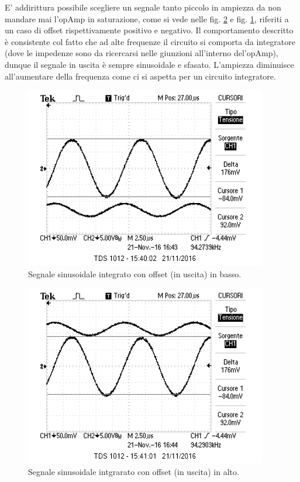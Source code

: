\documentclass[10pt,a4paper]{article}
\begin{document}
E' addirittura possibile scegliere un segnale tanto piccolo in ampiezza da non mandare mai l'opAmp in saturazione, come si vede nelle fig. \ref{senoAlto} e fig. \ref{senoBasso}, riferiti a un caso di offset rispettivamente positivo e negativo.
Il comportamento descritto è consistente col fatto che ad alte frequenze il circuito si comporta da integratore (dove le impedenze sono da ricercarsi nelle giunzioni all'interno del'opAmp), dunque il segnale in uscita è sempre sinusoidale e sfasato. L'ampiezza diminuisce all'aumentare della frequenza come ci si aspetta per un circuito integratore. 

\begin{figure}[htb!]
\centering
\includegraphics[scale=1.0]{immagini/sinusoidaleinBasso.png}
\caption{Segnale sinusoidale integrato con offset (in uscita) in basso.}
\label{senoBasso}
\end{figure}

\begin{figure}[htb!]
\centering
\includegraphics[scale=1.0]{immagini/sinusoidaleinAlto.png}
\caption{Segnale sinusoidale intgrarato con offset (in uscita) in alto.}
\label{senoAlto}
\end{figure}
\end{document}
